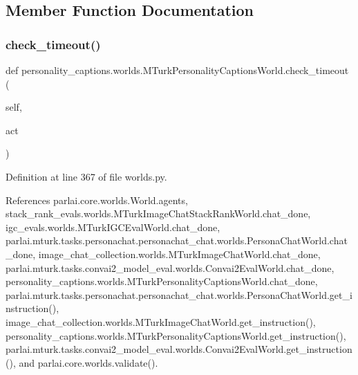 \subsection{Member Function Documentation}
\mbox{\label{classpersonality__captions_1_1worlds_1_1MTurkPersonalityCaptionsWorld_a594560fccee92084ad833d131c77d860}} 
\subsubsection{\texorpdfstring{check\+\_\+timeout()}{check\_timeout()}}
{\footnotesize\ttfamily def personality\+\_\+captions.\+worlds.\+M\+Turk\+Personality\+Captions\+World.\+check\+\_\+timeout (\begin{DoxyParamCaption}\item[{}]{self,  }\item[{}]{act }\end{DoxyParamCaption})}



Definition at line 367 of file worlds.\+py.



References parlai.\+core.\+worlds.\+World.\+agents, stack\+\_\+rank\+\_\+evals.\+worlds.\+M\+Turk\+Image\+Chat\+Stack\+Rank\+World.\+chat\+\_\+done, igc\+\_\+evals.\+worlds.\+M\+Turk\+I\+G\+C\+Eval\+World.\+chat\+\_\+done, parlai.\+mturk.\+tasks.\+personachat.\+personachat\+\_\+chat.\+worlds.\+Persona\+Chat\+World.\+chat\+\_\+done, image\+\_\+chat\+\_\+collection.\+worlds.\+M\+Turk\+Image\+Chat\+World.\+chat\+\_\+done, parlai.\+mturk.\+tasks.\+convai2\+\_\+model\+\_\+eval.\+worlds.\+Convai2\+Eval\+World.\+chat\+\_\+done, personality\+\_\+captions.\+worlds.\+M\+Turk\+Personality\+Captions\+World.\+chat\+\_\+done, parlai.\+mturk.\+tasks.\+personachat.\+personachat\+\_\+chat.\+worlds.\+Persona\+Chat\+World.\+get\+\_\+instruction(), image\+\_\+chat\+\_\+collection.\+worlds.\+M\+Turk\+Image\+Chat\+World.\+get\+\_\+instruction(), personality\+\_\+captions.\+worlds.\+M\+Turk\+Personality\+Captions\+World.\+get\+\_\+instruction(), parlai.\+mturk.\+tasks.\+convai2\+\_\+model\+\_\+eval.\+worlds.\+Convai2\+Eval\+World.\+get\+\_\+instruction(), and parlai.\+core.\+worlds.\+validate().



